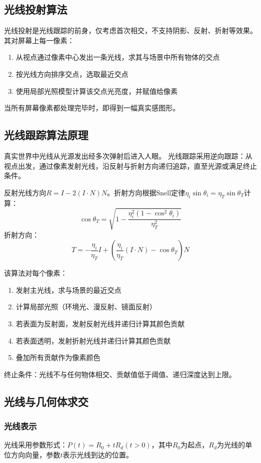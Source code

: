\documentclass[12pt]{article}
\begin{document}
\subsection{光线投射算法}

光线投射是光线跟踪的前身，仅考虑首次相交，不支持阴影、反射、折射等效果。其对屏幕上每一像素：
\begin{enumerate}
    \item 从视点通过像素中心发出一条光线，求其与场景中所有物体的交点
    \item 按光线方向排序交点，选取最近交点
    \item 使用局部光照模型计算该交点光亮度，并赋值给像素
\end{enumerate}
当所有屏幕像素都处理完毕时，即得到一幅真实感图形。

\subsection{光线跟踪算法原理}

真实世界中光线从光源发出经多次弹射后进入人眼。
光线跟踪采用逆向跟踪：从视点出发，通过像素发射光线，沿反射与折射方向递归追踪，直至光源或满足终止条件。

反射光线方向$R = I - 2(I \cdot N)N$。折射方向根据Snell定律$\eta_i \sin \theta_i = \eta_T \sin \theta_T$计算：
\[
\cos \theta_T = \sqrt{1 - \frac{\eta_i^2 (1 - \cos^2 \theta_i)}{\eta_T^2}}
\]
折射方向：
\[
T = -\frac{\eta_i}{\eta_T} I + \left( \frac{\eta_i}{\eta_T} (I \cdot N) - \cos \theta_T \right) N
\]

该算法对每个像素：
\begin{enumerate}
    \item 发射主光线，求与场景的最近交点
    \item 计算局部光照（环境光、漫反射、镜面反射）
    \item 若表面为反射面，发射反射光线并递归计算其颜色贡献
    \item 若表面透明，发射折射光线并递归计算其颜色贡献
    \item 叠加所有贡献作为像素颜色
\end{enumerate}
终止条件：光线不与任何物体相交、贡献值低于阈值、递归深度达到上限。

\subsection{光线与几何体求交}

\subsubsection{光线表示}
光线采用参数形式：$P(t) = R_0 + t R_d (t > 0)$，其中$R_0$为起点，$R_d$为光线的单位方向向量，参数$t$表示光线到达的位置。
\end{document}
